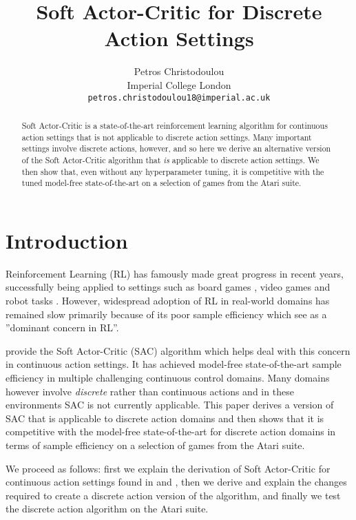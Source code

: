 \documentclass{article}
\title{Soft Actor-Critic for Discrete Action Settings}
\author{Petros Christodoulou \\
  Imperial College London \\
  \texttt{petros.christodoulou18@imperial.ac.uk}
}
\begin{document}
\maketitle



\begin{abstract}

Soft Actor-Critic is a state-of-the-art reinforcement learning algorithm for continuous action settings that is not applicable to discrete action settings. Many important settings involve discrete actions, however, and so here we derive an alternative version of the Soft Actor-Critic algorithm that \textit{is} applicable to discrete action settings. We then show that, even without any hyperparameter tuning, it is competitive with the tuned model-free state-of-the-art on a selection of games from the Atari suite.
\end{abstract}

\section{Introduction}

Reinforcement Learning (RL) has famously made great progress in recent years, successfully being applied to settings such as board games \citep{Go}, video games \citep{DQN_Atari} and robot tasks \citep{OpenAI2018LearningDI}.  However, widespread adoption of RL in real-world domains has remained slow  primarily because of its poor sample efficiency which \citet{AKTR} see as a ”dominant concern in RL”.

\citet{SAC} provide the Soft Actor-Critic (SAC) algorithm which helps deal with this concern in continuous action settings. It has achieved model-free state-of-the-art sample efficiency in multiple challenging continuous control domains. Many domains however involve \textit{discrete} rather than continuous actions and in these environments SAC is not currently applicable. This paper derives a version of SAC that is applicable to discrete action domains and then shows that it is competitive with the model-free state-of-the-art for discrete action domains in terms of sample efficiency on a selection of games from the Atari \citep{Atari} suite. 

We proceed as follows: first we explain the derivation of Soft Actor-Critic for continuous action settings found in \citet{SAC} and \citet{SACapplications}, then we derive and explain the changes required to create a discrete action version of the algorithm, and finally we test the discrete action algorithm on the Atari suite. 
\end{document}
